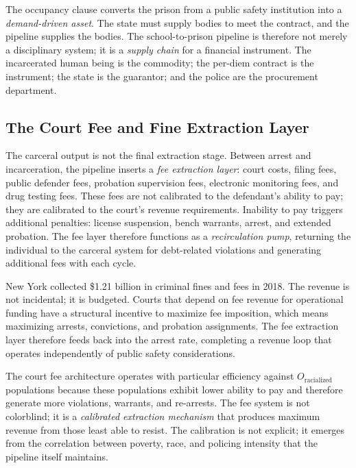 The occupancy clause converts the prison from a public safety institution into a \textit{demand-driven asset}. The state must supply bodies to meet the contract, and the pipeline supplies the bodies. The school-to-prison pipeline is therefore not merely a disciplinary system; it is a \textit{supply chain} for a financial instrument. The incarcerated human being is the commodity; the per-diem contract is the instrument; the state is the guarantor; and the police are the procurement department.

\subsection{The Court Fee and Fine Extraction Layer}

The carceral output is not the final extraction stage. Between arrest and incarceration, the pipeline inserts a \textit{fee extraction layer}: court costs, filing fees, public defender fees, probation supervision fees, electronic monitoring fees, and drug testing fees. These fees are not calibrated to the defendant's ability to pay; they are calibrated to the court's revenue requirements. Inability to pay triggers additional penalties: license suspension, bench warrants, arrest, and extended probation. The fee layer therefore functions as a \textit{recirculation pump}, returning the individual to the carceral system for debt-related violations and generating additional fees with each cycle.

New York collected \$1.21 billion in criminal fines and fees in 2018. The revenue is not incidental; it is budgeted. Courts that depend on fee revenue for operational funding have a structural incentive to maximize fee imposition, which means maximizing arrests, convictions, and probation assignments. The fee extraction layer therefore feeds back into the arrest rate, completing a revenue loop that operates independently of public safety considerations.

The court fee architecture operates with particular efficiency against $O_{\text{racialized}}$ populations because these populations exhibit lower ability to pay and therefore generate more violations, warrants, and re-arrests. The fee system is not colorblind; it is a \textit{calibrated extraction mechanism} that produces maximum revenue from those least able to resist. The calibration is not explicit; it emerges from the correlation between poverty, race, and policing intensity that the pipeline itself maintains.

